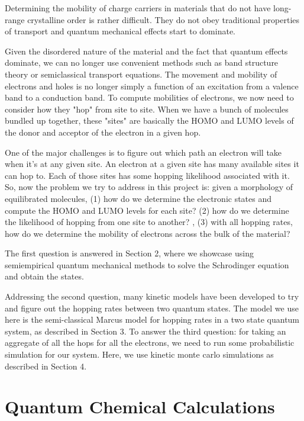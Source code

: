 \documentclass{article}
\begin{document}
Determining the mobility of charge carriers in materials that do not have long-range crystalline order is rather difficult. They do not obey traditional properties of transport and quantum mechanical effects start to dominate.

Given the disordered nature of the material and the fact that quantum effects dominate, we can no longer use convenient methods such as band structure theory or semiclassical transport equations. The movement and mobility of electrons and holes is no longer simply a function of an excitation from a valence band to a conduction band. To compute mobilities of electrons, we now need to consider how they "hop" from site to site. When we have a bunch of molecules bundled up together, these "sites" are basically the HOMO and LUMO levels of the donor and acceptor of the electron in a given hop.

One of the major challenges is to figure out which path an electron will take when it's at any given site. An electron at a given site has many available sites it can hop to. Each of those sites has some hopping likelihood associated with it. So, now the problem we try to address in this project is: given a morphology of equilibrated molecules, (1) how do we determine the electronic states and compute the HOMO and LUMO levels for each site? (2) how do we determine the likelihood of hopping from one site to another? , (3) with all hopping rates, how do we determine the mobility of electrons across the bulk of the material?

The first question is answered in Section 2, where we showcase using semiempirical quantum mechanical methods to solve the Schrodinger equation and obtain the states.

Addressing the second question, many kinetic models have been developed to try and figure out the hopping rates between two quantum states. The model we use here is the semi-classical Marcus model for hopping rates in a two state quantum system, as described in Section 3. To answer the third question: for taking an aggregate of all the hops for all the electrons, we need to run some probabilistic simulation for our system. Here, we use kinetic monte carlo simulations as described in Section 4.

\section{Quantum Chemical Calculations}

\end{document}
